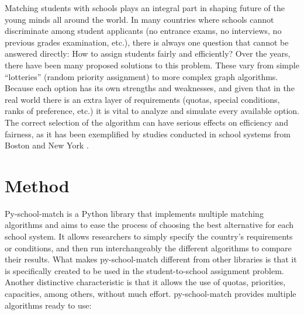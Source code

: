 \documentclass[twocolumn]{bmcart}
\begin{document}
	Matching students with schools plays an integral part in shaping future of the young minds all around the world. In many countries where schools cannot discriminate among student applicants (no entrance exams, no interviews, no previous grades examination, etc.), there is always one
	question that cannot be answered directly: How to assign students fairly and efficiently?
	\vspace{\baselineskip}
	Over the years, there have been many proposed solutions to this problem. These vary from simple “lotteries” (random priority assignment) to more complex graph algorithms. Because each option has its own strengths and weaknesses, and given that in the real world there is an extra layer of requirements (quotas, special conditions, ranks of preference, etc.) it is vital to analyze and simulate every available option. The correct selection of the algorithm can have serious effects on efficiency and fairness, as it has been exemplified by studies conducted in school systems from Boston \cite{sub1} and New York \cite{sub2}.
	
	
	
	\section*{Method}
	\vspace{\baselineskip}
	Py-school-match \cite{article} is a Python library that implements multiple matching algorithms and aims to ease the process of choosing the best alternative for each school system. It allows researchers to simply specify the country’s requirements or conditions, and then run interchangeably the different algorithms to compare their results. What makes py-school-match different from other libraries is that it is specifically created to be used in the student-to-school assignment problem. Another distinctive characteristic is that it allows the use of quotas, priorities, capacities, among others, without much effort. \vspace{\baselineskip}
	py-school-match provides multiple algorithms ready to use: \vspace{\baselineskip}
	
\end{document}

